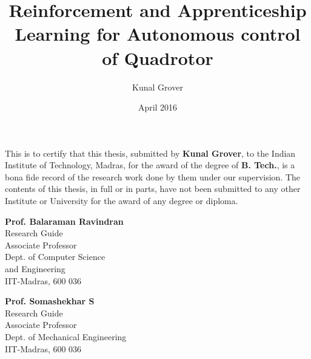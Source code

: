 \documentclass[hidelinks,BTech]{iitmdiss}
\begin{document}
\graphicspath{{images/}	}

\title{Reinforcement and Apprenticeship Learning for Autonomous control of Quadrotor}

\author{Kunal Grover}

\date{April 2016}

\maketitle

\certificate

\vspace*{0.5in}

\noindent This is to certify that this thesis, submitted by {\bf Kunal Grover}, to the Indian Institute of Technology, Madras, for the award of the degree of {\bf B. Tech.}, is a bona fide record of the research work done by them under our supervision. The contents of this thesis, in full or in parts, have not been submitted to any other Institute or University for the award of any degree or diploma.

\vspace*{1.5in}

\begin{singlespacing}

\begin{minipage}[t]{0.45\textwidth}
  {\bf Prof. Balaraman Ravindran} \\
  Research Guide \\
  Associate Professor \\
  Dept. of Computer Science \\
  and Engineering \\
  IIT-Madras, 600 036
\end{minipage}
\hfill
\begin{minipage}[t]{0.45\textwidth}
  {\bf Prof. Somashekhar S} \\
  Research Guide \\
  Associate Professor \\
  Dept. of Mechanical Engineering \\
  IIT-Madras, 600 036
\end{minipage}

\end{singlespacing}
\end{document}
